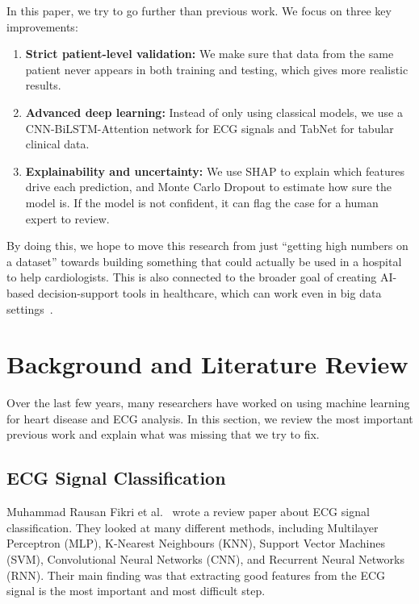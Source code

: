 \documentclass[10pt, twocolumn]{article}
\begin{document}
In this paper, we try to go further than previous work. We focus on three key improvements:
\begin{enumerate}[leftmargin=*, label=\textbf{\arabic*.}]
  \item \textbf{Strict patient-level validation:} We make sure that data from the same
        patient never appears in both training and testing, which gives more realistic results.
  \item \textbf{Advanced deep learning:} Instead of only using classical models, we use a
        CNN-BiLSTM-Attention network for ECG signals and TabNet for tabular clinical data.
  \item \textbf{Explainability and uncertainty:} We use SHAP to explain which features
        drive each prediction, and Monte Carlo Dropout to estimate how sure the model is.
        If the model is not confident, it can flag the case for a human expert to review.
\end{enumerate}

By doing this, we hope to move this research from just ``getting high numbers on a dataset''
towards building something that could actually be used in a hospital to help cardiologists.
This is also connected to the broader goal of creating AI-based decision-support tools in
healthcare, which can work even in big data settings~\cite{tourad2018,outfarouin2016}.

\section{Background and Literature Review}

Over the last few years, many researchers have worked on using machine learning for heart
disease and ECG analysis. In this section, we review the most important previous work and
explain what was missing that we try to fix.

\subsection{ECG Signal Classification}

Muhammad Rausan Fikri et al.~\cite{muhammad2021} wrote a review paper about ECG signal
classification. They looked at many different methods, including Multilayer Perceptron (MLP),
K-Nearest Neighbours (KNN), Support Vector Machines (SVM), Convolutional Neural Networks (CNN),
and Recurrent Neural Networks (RNN). Their main finding was that extracting good features from
the ECG signal is the most important and most difficult step.
\end{document}
